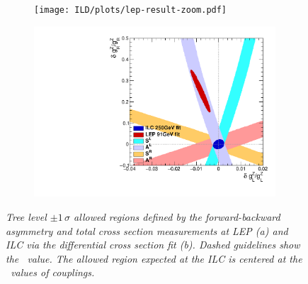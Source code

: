 \begin{figure}
	\centering
	\begin{subfigure}{0.5\textwidth}
		\texttt{[image: ILD/plots/lep-result-zoom.pdf]}
		\caption{\label{fig:LEPILCResult_a_3F} }
	\end{subfigure}%
	\begin{subfigure}{0.5\textwidth}
		\centering
		\includegraphics[width=0.99\textwidth]{ILD/plots/ilc-result.pdf}
		\caption{\label{fig:LEPILCResult_b_3F} }
	\end{subfigure}
	\caption{\sl Tree level $\pm 1\,\sigma$ allowed regions defined by the forward-backward asymmetry and total cross section measurements at LEP (a) and ILC via the differential cross section fit (b). Dashed guidelines show the \sm\ value. The allowed region expected at the ILC is centered at the \sm\ values of couplings.}
	\label{fig:LEPILCResult_3F}
\end{figure}







